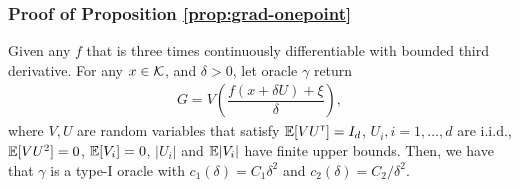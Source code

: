 \subsubsection*{Proof of Proposition \ref{prop:grad-onepoint}}

\begin{proposition}
\label{prop:grad-1spsa}
Given any $f$ that is three times continuously differentiable with bounded third derivative.
For any $x \in \mathcal{K}$, and $\delta >0$, let oracle $\gamma$ return
\begin{align}
G =  V \left(\dfrac{f(x+\delta U) + \xi}{\delta}\right),
 \label{eq:onesp}
\end{align}
where $V, U$ are random variables that satisfy $\mathbb{E}[V U^\mathsf{\scriptscriptstyle T}] = I_d$, $U_i, i=1,\ldots,d$ are i.i.d., $\mathbb{E}[ V U^2] = 0$, $\mathbb{E}[V_i]=0$, $|U_i|$ and $\mathbb{E}|V_i|$ have finite upper bounds.
Then, we have that $\gamma$ is a type-I oracle with $c_1(\delta) = C_1 \delta^2$ and $c_2(\delta) = C_2/\delta^2$.
\end{proposition}
\fi
